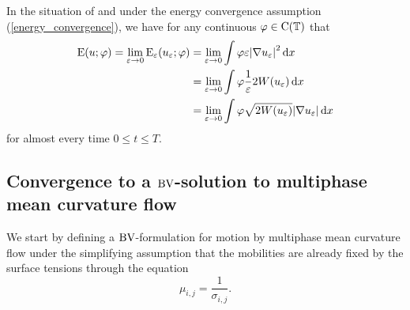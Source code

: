 \begin{lemma}
	\label{equipartition_of_energies_multiphase}
	In the situation of  and under the energy convergence assumption (\ref{energy_convergence}), we have for any continuous $ \varphi \in \operatorname{C} ( \operatorname{\mathbb{T}} ) $ that
	\begin{align*}
		\operatorname{E} ( u ; \varphi )
		=
		\lim_{ \varepsilon \to 0 }
			\operatorname{E}_{ \varepsilon } ( u_{ \varepsilon } ; \varphi )
		& =
		\lim_{ \varepsilon \to 0 }
			\int
				\varphi
				\varepsilon
				\abs{ \nabla u_{ \varepsilon } }^{ 2 }
			\dd{ x }
		\\
		& =
		\lim_{ \varepsilon \to 0 }
			\int
				\varphi
				\frac{ 1 }{ \varepsilon } 2 W ( u_{ \varepsilon } )
			\dd{ x }
		\\
		& =
		\lim_{ \varepsilon \to 0 }
			\int
				\varphi
				\sqrt{ 2 W ( u_{ \varepsilon } ) }
				\abs{ \nabla u_{ \varepsilon } }
			\dd{ x }
	\end{align*}
	for almost every time $ 0 \leq t \leq T $.
\end{lemma}

\subsection{Convergence to a $\operatorname{BV}$-solution to multiphase mean curvature flow}

We start by defining a $ \operatorname{BV} $-formulation for motion by multiphase mean curvature flow under the simplifying assumption that the mobilities are already fixed by the surface tensions through the equation
\begin{equation}
	\label{mobilites_inverse_of_surface_tensions}
	\mu_{ i , j } =\frac{ 1 }{ \sigma_{ i , j } }. 
\end{equation}

